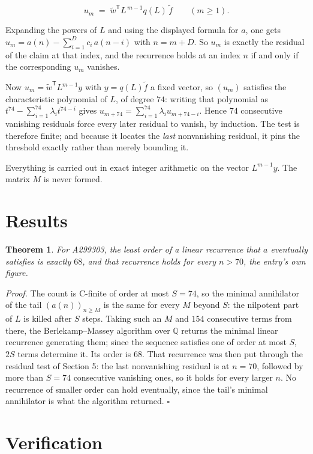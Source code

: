 \documentclass[11pt]{article}
\newtheorem{theorem}{Theorem}
\theoremstyle{definition}
\begin{document}
\[u_m \;=\; \tilde w^{\mathsf T} L^{\,m-1} q(L)\,\tilde f \qquad (m \ge 1).\]

Expanding the powers of $L$ and using the displayed formula for $a$, one gets $u_m = a(n) - \sum_{i=1}^{D} c_i\,a(n-i)$ with $n = m + D$. So $u_m$ is exactly the residual of the claim at that index, and the recurrence holds at an index $n$ if and only if the corresponding $u_m$ vanishes.

Now $u_m = \tilde w^{\mathsf T} L^{m-1} y$ with $y = q(L)\tilde f$ a fixed vector, so $(u_m)$ satisfies the characteristic polynomial of $L$, of degree $74$: writing that polynomial as $t^{74} - \sum_{i=1}^{74} \lambda_i t^{74-i}$ gives $u_{m+74} = \sum_{i=1}^{74} \lambda_i u_{m+74-i}$. Hence $74$ consecutive vanishing residuals force every later residual to vanish, by induction. The test is therefore finite; and because it locates the {\itshape last} nonvanishing residual, it pins the threshold exactly rather than merely bounding it.

Everything is carried out in exact integer arithmetic on the vector $L^{m-1}y$. The matrix $M$ is never formed.

\section{Results}

\begin{theorem} For A299303, the least order of a linear recurrence that $a$ eventually satisfies is exactly $68$, and that recurrence holds for every $n > 70$, the entry's own figure.\end{theorem}

{\itshape Proof.} The count is C-finite of order at most $S = 74$, so the minimal annihilator of the tail $(a(n))_{n \ge M}$ is the same for every $M$ beyond $S$: the nilpotent part of $L$ is killed after $S$ steps. Taking such an $M$ and $154$ consecutive terms from there, the Berlekamp--Massey algorithm over $\mathbb{Q}$ returns the minimal linear recurrence generating them; since the sequence satisfies one of order at most $S$, $2S$ terms determine it. Its order is $68$. That recurrence was then put through the residual test of Section 5: the last nonvanishing residual is at $n = 70$, followed by more than $S = 74$ consecutive vanishing ones, so it holds for every larger $n$. No recurrence of smaller order can hold eventually, since the tail's minimal annihilator is what the algorithm returned. $\square$

\section{Verification}
\end{document}
